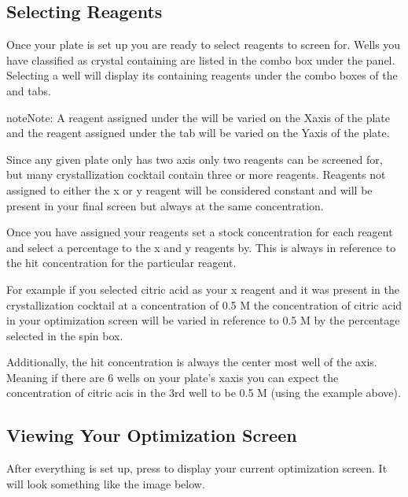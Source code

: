 \documentclass[letterpaper,10pt,english]{sphinxmanual}
\begin{document}
\subsection{Selecting Reagents}
\label{\detokenize{user_guide:selecting-reagents}}
Once your plate is set up you are ready to select reagents to screen for.
Wells you have classified as crystal containing are listed in the 
combo box under the  panel. Selecting a well will display
its containing reagents under the  combo boxes of the
 and  tabs.

\begin{sphinxadmonition}{note}{Note:}
A reagent assigned under the  will be varied on the X\sphinxhyphen{}axis of the plate and the reagent assigned under the  tab will be varied on the Y\sphinxhyphen{}axis of the plate.
\end{sphinxadmonition}

Since any given plate only has two axis only two reagents can be screened for,
but many crystallization cocktail contain three or more reagents. Reagents not
assigned to either the x or y reagent will be considered constant and will
be present in your final screen but always at the same concentration.

Once you have assigned your reagents set a stock concentration for each reagent and
select a percentage to the x and y reagents by. This is always in reference to the
hit concentration for the particular reagent.

For example if you selected citric acid as your x reagent and it was present
in the crystallization cocktail at a concentration of 0.5 M the concentration
of citric acid in your optimization screen will be varied in reference to
0.5 M by the percentage selected in the  spin box.

Additionally, the hit concentration is always the center most well of the
axis. Meaning if there are 6 wells on your plate’s x\sphinxhyphen{}axis you can expect
the concentration of citric acis in the 3rd well to be 0.5 M (using the
example above).


\subsection{Viewing Your Optimization Screen}
\label{\detokenize{user_guide:viewing-your-optimization-screen}}
After everything is set up, press  to display your
current optimization screen. It will look something like the image below.
\begin{quote}

\noindent{}
\end{quote}
\end{document}
